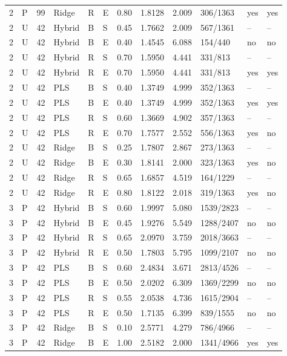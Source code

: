 \documentclass[10pt,a4paper]{article}
\begin{document}
\begin{landscape}
\begin{longtable}{rlrlllrrrlll}
2 & P & 99 & Ridge & R & E & 0.80 & 1.8128 & 2.009 & 306/1363 & yes & yes \\
2 & U & 42 & Hybrid & B & S & 0.45 & 1.7662 & 2.009 & 567/1361 & -- & -- \\
2 & U & 42 & Hybrid & B & E & 0.40 & 1.4545 & 6.088 & 154/440 & no & no \\
2 & U & 42 & Hybrid & R & S & 0.70 & 1.5950 & 4.441 & 331/813 & -- & -- \\
2 & U & 42 & Hybrid & R & E & 0.70 & 1.5950 & 4.441 & 331/813 & yes & yes \\
2 & U & 42 & PLS & B & S & 0.40 & 1.3749 & 4.999 & 352/1363 & -- & -- \\
2 & U & 42 & PLS & B & E & 0.40 & 1.3749 & 4.999 & 352/1363 & yes & yes \\
2 & U & 42 & PLS & R & S & 0.60 & 1.3669 & 4.902 & 357/1363 & -- & -- \\
2 & U & 42 & PLS & R & E & 0.70 & 1.7577 & 2.552 & 556/1363 & yes & no \\
2 & U & 42 & Ridge & B & S & 0.25 & 1.7807 & 2.867 & 273/1363 & -- & -- \\
2 & U & 42 & Ridge & B & E & 0.30 & 1.8141 & 2.000 & 323/1363 & yes & no \\
2 & U & 42 & Ridge & R & S & 0.65 & 1.6857 & 4.519 & 164/1229 & -- & -- \\
2 & U & 42 & Ridge & R & E & 0.80 & 1.8122 & 2.018 & 319/1363 & yes & no \\
3 & P & 42 & Hybrid & B & S & 0.60 & 1.9997 & 5.080 & 1539/2823 & -- & -- \\
3 & P & 42 & Hybrid & B & E & 0.45 & 1.9276 & 5.549 & 1288/2407 & no & no \\
3 & P & 42 & Hybrid & R & S & 0.65 & 2.0970 & 3.759 & 2018/3663 & -- & -- \\
3 & P & 42 & Hybrid & R & E & 0.50 & 1.7803 & 5.795 & 1099/2107 & no & no \\
3 & P & 42 & PLS & B & S & 0.60 & 2.4834 & 3.671 & 2813/4526 & -- & -- \\
3 & P & 42 & PLS & B & E & 0.50 & 2.0202 & 6.309 & 1369/2299 & no & no \\
3 & P & 42 & PLS & R & S & 0.55 & 2.0538 & 4.736 & 1615/2904 & -- & -- \\
3 & P & 42 & PLS & R & E & 0.50 & 1.7135 & 6.399 & 839/1555 & no & no \\
3 & P & 42 & Ridge & B & S & 0.10 & 2.5771 & 4.279 & 786/4966 & -- & -- \\
3 & P & 42 & Ridge & B & E & 1.00 & 2.5182 & 2.000 & 1341/4966 & yes & yes \\

\end{longtable}
\end{landscape}
\end{document}
